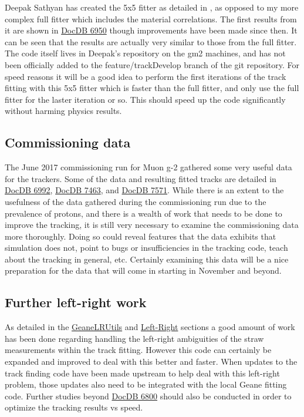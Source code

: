 		Deepak Sathyan has created the 5x5 fitter as detailed in \cite{geanemanual}, as opposed to my more complex full fitter which includes the material correlations. The first results from it are shown in \href{https://gm2-docdb.fnal.gov/cgi-bin/private/ShowDocument?docid=6950}{DocDB 6950} though improvements have been made since then. It can be seen that the results are actually very similar to those from the full fitter. The code itself lives in Deepak's repository on the gm2 machines, and has not been officially added to the feature/trackDevelop branch of the git repository. For speed reasons it will be a good idea to perform the first iterations of the track fitting with this 5x5 fitter which is faster than the full fitter, and only use the full fitter for the laster iteration or so. This should speed up the code significantly without harming physics results.

	\subsection{Commissioning data}

		The June 2017 commissioning run for Muon g-2 gathered some very useful data for the trackers. Some of the data and resulting fitted tracks are detailed in \href{https://gm2-docdb.fnal.gov/cgi-bin/private/ShowDocument?docid=6992}{DocDB 6992}, \href{https://gm2-docdb.fnal.gov/cgi-bin/private/ShowDocument?docid=7463}{DocDB 7463}, and \href{https://gm2-docdb.fnal.gov/cgi-bin/private/ShowDocument?docid=7571}{DocDB 7571}. While there is an extent to the usefulness of the data gathered during the commissioning run due to the prevalence of protons, and there is a wealth of work that needs to be done to improve the tracking, it is still very necessary to examine the commissioning data more thoroughly. Doing so could reveal features that the data exhibits that simulation does not, point to bugs or insufficiencies in the tracking code, teach about the tracking in general, etc. Certainly examining this data will be a nice preparation for the data that will come in starting in November and beyond.

	\subsection{Further left-right work}

		As detailed in the \hyperref[sec:GeaneLRUtils]{GeaneLRUtils} and \hyperref[sec:LR]{Left-Right} sections a good amount of work has been done regarding handling the left-right ambiguities of the straw measurements within the track fitting. However this code can certainly be expanded and improved to deal with this better and faster. When updates to the track finding code have been made upstream to help deal with this left-right problem, those updates also need to be integrated with the local Geane fitting code. Further studies beyond \href{https://gm2-docdb.fnal.gov/cgi-bin/private/ShowDocument?docid=6800}{DocDB 6800} should also be conducted in order to optimize the tracking results vs speed.

